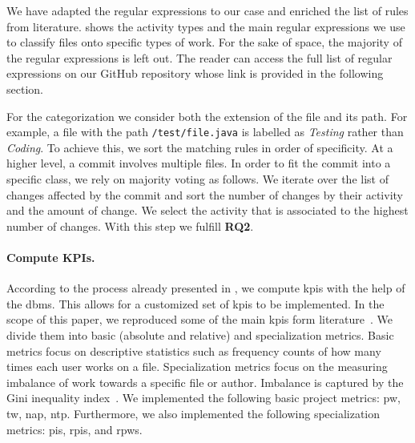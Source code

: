 

We have adapted the regular expressions to our case and enriched the list of rules from literature.  shows the activity types and the main regular expressions we use to classify files onto specific types of work. For the sake of space, the majority of the regular expressions is left out. The reader can access the full list of regular expressions on our GitHub repository whose link is provided in the following section.


For the categorization we consider both the extension of the file and its path. For example, a file with the path \lstinline{/test/file.java} is labelled as \textsl{Testing} rather than \textsl{Coding}. To achieve this, we sort the matching rules in order of specificity. 
At a higher level, a commit involves multiple files. In order to fit the commit into a specific class, we rely on majority voting as follows. We iterate over the list of changes affected by the commit and sort the number of changes by their activity and the amount of change. We select the activity that is associated to the highest number of changes. With this step we fulfill \textbf{RQ2}.

\paragraph{Compute KPIs.}

According to the process already presented in , we compute \glspl{kpi} with the help of the \gls{dbms}. This allows for a customized set of \glspl{kpi} to be implemented. In the scope of this paper, we reproduced some of the main \glspl{kpi} form literature~\cite{DBLP:journals/ese/VasilescuSGM14}. We divide them into basic (absolute and relative) and specialization metrics. Basic metrics focus on descriptive statistics such as frequency counts of how many times each user works on a file. Specialization metrics focus on the measuring imbalance of work towards a specific file or author. Imbalance is captured by the Gini inequality index~\cite{gini1921measurement}.
We implemented the following basic project metrics: \gls{pw}, \gls{tw}, \gls{nap}, \gls{ntp}. Furthermore, we also implemented the following specialization metrics: \gls{pis}, \gls{rpis}, and \gls{rpws}. 


